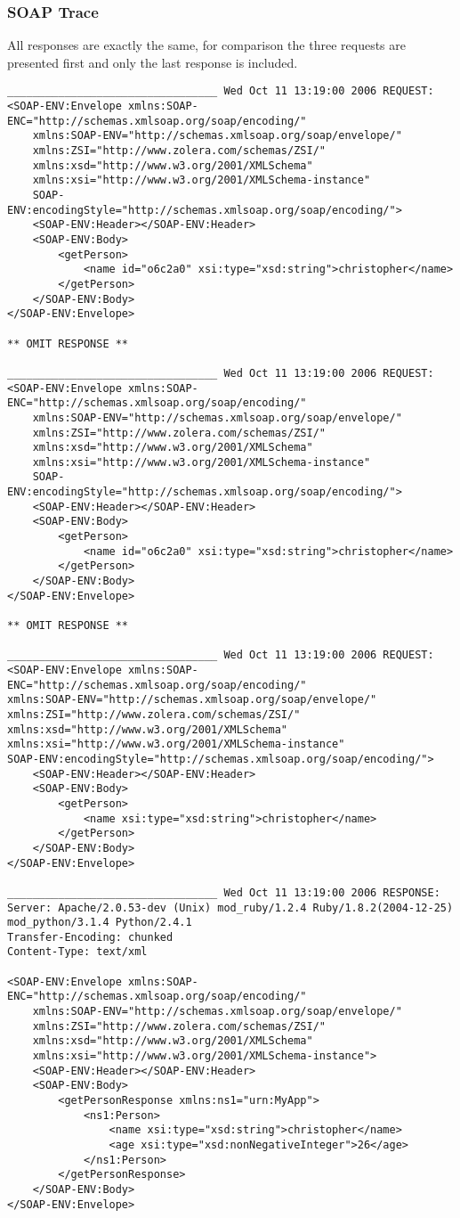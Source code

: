 \subsubsection{SOAP Trace} All responses are exactly the same, for comparison
the three requests are presented first and only the last response is included.
\begin{verbatim}
_________________________________ Wed Oct 11 13:19:00 2006 REQUEST:
<SOAP-ENV:Envelope xmlns:SOAP-ENC="http://schemas.xmlsoap.org/soap/encoding/"
	xmlns:SOAP-ENV="http://schemas.xmlsoap.org/soap/envelope/"
	xmlns:ZSI="http://www.zolera.com/schemas/ZSI/"
	xmlns:xsd="http://www.w3.org/2001/XMLSchema"
	xmlns:xsi="http://www.w3.org/2001/XMLSchema-instance"
	SOAP-ENV:encodingStyle="http://schemas.xmlsoap.org/soap/encoding/">
	<SOAP-ENV:Header></SOAP-ENV:Header>
	<SOAP-ENV:Body>
		<getPerson>
			<name id="o6c2a0" xsi:type="xsd:string">christopher</name>
		</getPerson>
	</SOAP-ENV:Body>
</SOAP-ENV:Envelope>

** OMIT RESPONSE **

_________________________________ Wed Oct 11 13:19:00 2006 REQUEST:
<SOAP-ENV:Envelope xmlns:SOAP-ENC="http://schemas.xmlsoap.org/soap/encoding/"
	xmlns:SOAP-ENV="http://schemas.xmlsoap.org/soap/envelope/"
	xmlns:ZSI="http://www.zolera.com/schemas/ZSI/"
	xmlns:xsd="http://www.w3.org/2001/XMLSchema"
	xmlns:xsi="http://www.w3.org/2001/XMLSchema-instance"
	SOAP-ENV:encodingStyle="http://schemas.xmlsoap.org/soap/encoding/">
	<SOAP-ENV:Header></SOAP-ENV:Header>
	<SOAP-ENV:Body>
		<getPerson>
			<name id="o6c2a0" xsi:type="xsd:string">christopher</name>
		</getPerson>
	</SOAP-ENV:Body>
</SOAP-ENV:Envelope>

** OMIT RESPONSE **

_________________________________ Wed Oct 11 13:19:00 2006 REQUEST:
<SOAP-ENV:Envelope xmlns:SOAP-ENC="http://schemas.xmlsoap.org/soap/encoding/"
xmlns:SOAP-ENV="http://schemas.xmlsoap.org/soap/envelope/"
xmlns:ZSI="http://www.zolera.com/schemas/ZSI/"
xmlns:xsd="http://www.w3.org/2001/XMLSchema"
xmlns:xsi="http://www.w3.org/2001/XMLSchema-instance"
SOAP-ENV:encodingStyle="http://schemas.xmlsoap.org/soap/encoding/">
	<SOAP-ENV:Header></SOAP-ENV:Header>
	<SOAP-ENV:Body>
		<getPerson>
			<name xsi:type="xsd:string">christopher</name>
		</getPerson>
	</SOAP-ENV:Body>
</SOAP-ENV:Envelope>

_________________________________ Wed Oct 11 13:19:00 2006 RESPONSE:
Server: Apache/2.0.53-dev (Unix) mod_ruby/1.2.4 Ruby/1.8.2(2004-12-25)
mod_python/3.1.4 Python/2.4.1
Transfer-Encoding: chunked
Content-Type: text/xml

<SOAP-ENV:Envelope xmlns:SOAP-ENC="http://schemas.xmlsoap.org/soap/encoding/"
	xmlns:SOAP-ENV="http://schemas.xmlsoap.org/soap/envelope/"
	xmlns:ZSI="http://www.zolera.com/schemas/ZSI/"
	xmlns:xsd="http://www.w3.org/2001/XMLSchema"
	xmlns:xsi="http://www.w3.org/2001/XMLSchema-instance">
	<SOAP-ENV:Header></SOAP-ENV:Header>
	<SOAP-ENV:Body>
		<getPersonResponse xmlns:ns1="urn:MyApp">
			<ns1:Person>
				<name xsi:type="xsd:string">christopher</name>
				<age xsi:type="xsd:nonNegativeInteger">26</age>
			</ns1:Person>
		</getPersonResponse>
	</SOAP-ENV:Body>
</SOAP-ENV:Envelope>
\end{verbatim}

